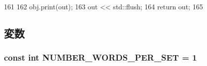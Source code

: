 \begin{DoxyCode}
161 {
162     obj.print(out);
163     out << std::flush;
164     return out;
165 }
\end{DoxyCode}


\subsection{変数}
\hypertarget{Set_8hh_aeafee2fb41f8658683a0f674ac339e3d}{
\subsubsection[{NUMBER\_\-WORDS\_\-PER\_\-SET}]{\setlength{\rightskip}{0pt plus 5cm}const int {\bf NUMBER\_\-WORDS\_\-PER\_\-SET} = 1}}
\label{Set_8hh_aeafee2fb41f8658683a0f674ac339e3d}
